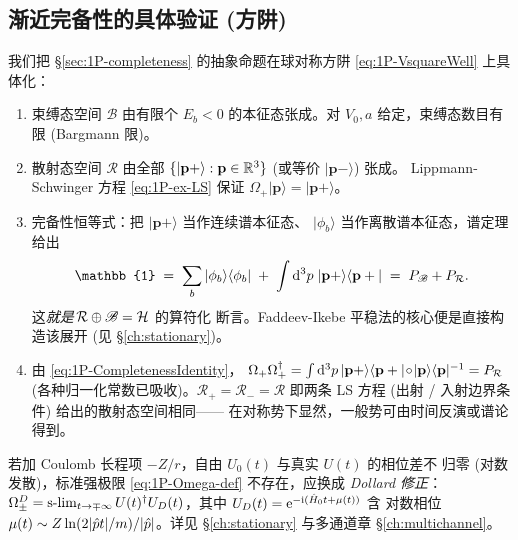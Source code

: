 \subsection{渐近完备性的具体验证 (方阱)}
\label{ssec:1P-completeVerify}

我们把 \S\ref{sec:1P-completeness} 的抽象命题在球对称方阱
\eqref{eq:1P-VsquareWell} 上具体化：

\begin{enumerate}
  \item 束缚态空间 $\mathscr{B}$ 由有限个 $E_b<0$ 的本征态张成。对
        $V_0,a$ 给定，束缚态数目有限 (Bargmann 限)。
  \item 散射态空间 $\mathcal{R}$ 由全部 $\{|\mathbf{p}+\rangle:
        \mathbf{p}\in\mathbb{R}^3\}$ (或等价 $|\mathbf{p}-\rangle$) 张成。
        Lippmann-Schwinger 方程 \eqref{eq:1P-ex-LS} 保证
        $\Omega_+|\mathbf{p}\rangle = |\mathbf{p}+\rangle$。
  \item 完备性恒等式：把 $|\mathbf{p}+\rangle$ 当作连续谱本征态、
        $|\phi_b\rangle$ 当作离散谱本征态，谱定理给出
\begin{equation}
  \mathbb{1} \;=\; \sum_b |\phi_b\rangle\langle\phi_b|
            \;+\; \int\rmd^3p\;|\mathbf{p}+\rangle\langle\mathbf{p}+|
       \;=\; P_\mathscr{B} + P_\mathcal{R}.
  \label{eq:1P-CompletenessIdentity}
\end{equation}
        这\emph{就是}\,$\mathcal{R}\oplus\mathscr{B}=\mathcal{H}$ 的算符化
        断言。Faddeev-Ikebe 平稳法的核心便是直接构造该展开 (见
        \S\ref{ch:stationary})。
  \item 由 \eqref{eq:1P-CompletenessIdentity}，
        $\Omega_+\Omega_+^\dagger = \int\mathrm{d}^3p\,|\mathbf{p}+\rangle
        \langle\mathbf{p}+|\!\circ\!|\mathbf{p}\rangle\langle\mathbf{p}|^{-1}
        = P_\mathcal{R}$ (各种归一化常数已吸收)。$\mathcal{R}_+=\mathcal{R}_-=\mathcal{R}$
        即两条 LS 方程 (出射 / 入射边界条件) 给出的散射态空间相同——
        在对称势下显然，一般势可由时间反演或谱论得到。
\end{enumerate}

\begin{remark}[渐近完备性失败的反例提示]
若加 Coulomb 长程项 $-Z/r$，自由 $U_0(t)$ 与真实 $U(t)$ 的相位差不
归零 (对数发散)，标准强极限 \eqref{eq:1P-Omega-def} 不存在，应换成
\emph{Dollard 修正}：$\Omega^D_\pm = \operatorname*{s\text{-}lim}_{t\to\mp\infty}U(t)^\dagger
U_D(t)$，其中 $U_D(t) = \mathrm{e}^{-\mathrm{i}(\hat{H}_0 t + \mu(t))}$ 含
对数相位 $\mu(t)\sim Z\ln(2|\hat{p}t|/m)/|\hat{p}|$。详见
\S\ref{ch:stationary} 与多通道章 \S\ref{ch:multichannel}。
\end{remark}

